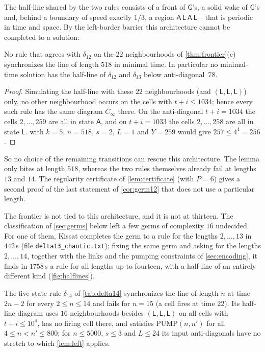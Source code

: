 The half-line shared by the two rules
consists of a front of $\mathsf G$'s, a solid wake of $\mathsf G$'s and,
behind a boundary of speed exactly $1/3$, a region
$\mathsf{A}\,\mathsf{L}\,\mathsf{A}\,\mathsf{L}\cdots$ that is periodic in
time and space. By the left-border barrier this architecture cannot be
completed to a solution:

\begin{corollary}\label{cor:germ12}
No rule that agrees with $\delta_{12}$ on the $22$ neighbourhoods of
\cref{thm:frontier}(c) synchronizes the line of length $518$ in minimal
time. In particular no minimal-time solution has the half-line of
$\delta_{12}$ and $\delta_{13}$ below anti-diagonal~$78$.
\end{corollary}

\begin{proof}
Simulating the half-line with these $22$ neighbourhoods (and
$(\mathsf L,\mathsf L,\mathsf L)$) only, no other neighbourhood occurs on
the cells with $t+i\le1034$; hence every such rule has the same diagram
$C_\infty$ there. On the anti-diagonal $t+i=1034$ the cells $2,\dots,259$
are all in state $\mathsf A$, and on $t+i=1033$ the cells $2,\dots,258$ are
all in state $\mathsf L$.  with $k=5$, $n=518$, $s=2$,
$L=1$ and $Y=259$ would give $257\le4^4=256$.
\end{proof}

So no choice of the remaining transitions can rescue this architecture.
The lemma only bites at length $518$, whereas the two rules themselves
already fail at lengths $13$ and $14$. The regularity certificate of
\cref{lem:certificate} (with $P=6$) gives a second proof of the last statement
of \cref{cor:germ12} that does not use a particular length.

The frontier is not tied to this architecture, and it is not at
thirteen. The classification of \cref{sec:germs} below left a few germs of
complexity $16$ undecided. For one of them, Kissat completes the germ to a
rule for the lengths $2,\dots,13$ in $442$\,s (file
\texttt{delta13\_chaotic.txt}); fixing the same germ and asking for the
lengths $2,\dots,14$, together with the links and the pumping constraints
of \cref{sec:encoding}, it finds in $1758$\,s a rule for all lengths up to
fourteen, with a half-line of an entirely different kind
(\cref{fig:halflines}).

\begin{proposition}\label{prop:chaotic}
The five-state rule $\delta_{14}$ of \cref{tab:delta14} synchronizes the
line of length $n$ at time $2n-2$ for every $2\le n\le14$ and fails for
$n=15$ (a cell fires at time $22$). Its half-line diagram uses $16$
neighbourhoods besides $(\mathsf L,\mathsf L,\mathsf L)$ on all cells with
$t+i\le10^4$, has no firing cell there, and satisfies $\mathrm{PUMP}(n,n')$
for all $4\le n<n'\le800$; for $n\le5000$, $s\le3$ and $L\le24$ its input
anti-diagonals have no stretch to which \cref{lem:left} applies.
\end{proposition}

